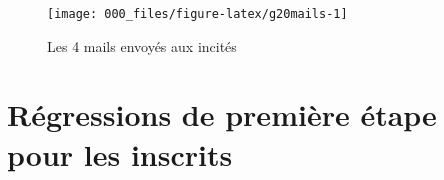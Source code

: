 \documentclass[
]{book}
\begin{document}
\begin{figure}[H]

{\centering \texttt{[image: 000\_files/figure-latex/g20mails-1]} 

}

\caption{Les 4 mails envoyés aux incités}\label{fig:g20mails}
\end{figure}

\newpage
\setcounter{table}{0}
\setcounter{figure}{0}

\hypertarget{g20pemodelsinsc}{%
\section{Régressions de première étape pour les inscrits}\label{g20pemodelsinsc}}

\begingroup\fontsize{8}{10}\selectfont
\end{document}
